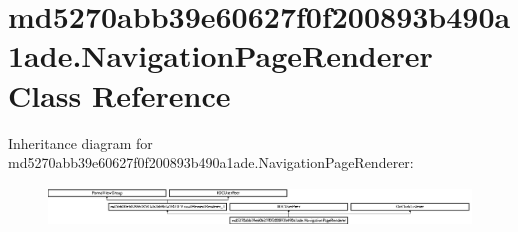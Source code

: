 \hypertarget{classmd5270abb39e60627f0f200893b490a1ade_1_1NavigationPageRenderer}{}\section{md5270abb39e60627f0f200893b490a1ade.\+Navigation\+Page\+Renderer Class Reference}
\label{classmd5270abb39e60627f0f200893b490a1ade_1_1NavigationPageRenderer}
Inheritance diagram for md5270abb39e60627f0f200893b490a1ade.\+Navigation\+Page\+Renderer\+:\begin{figure}[H]
\begin{center}
\leavevmode
\includegraphics[height=1.031941cm]{classmd5270abb39e60627f0f200893b490a1ade_1_1NavigationPageRenderer}
\end{center}
\end{figure}
